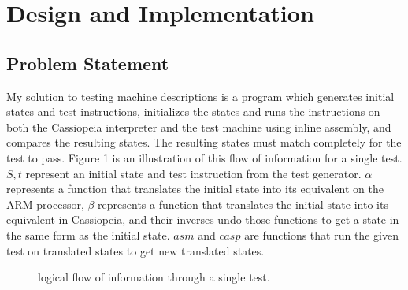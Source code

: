 \documentclass[letterpaper,12pt]{article}
\begin{document}
\section{Design and Implementation}

\subsection{Problem Statement}

My solution to testing machine descriptions is a program which generates initial states and test instructions, initializes the states and runs the instructions on both the Cassiopeia interpreter and the test machine using inline assembly, and compares the resulting states. The resulting states must match completely for the test to pass. Figure 1 is an illustration of this flow of information for a single test. $S, t$ represent an initial state and test instruction from the test generator. $\alpha$ represents a function that translates the initial state into its equivalent on the ARM processor, $\beta$ represents a function that translates the initial state into its equivalent in Cassiopeia, and their inverses undo those functions to get a state in the same form as the initial state. $asm$ and $casp$ are functions that run the given test on translated states to get new translated states.

\begin{figure}
\centering
{}
\caption{logical flow of information through a single test.} \label{fig:M1}
\end{figure}
\end{document}
